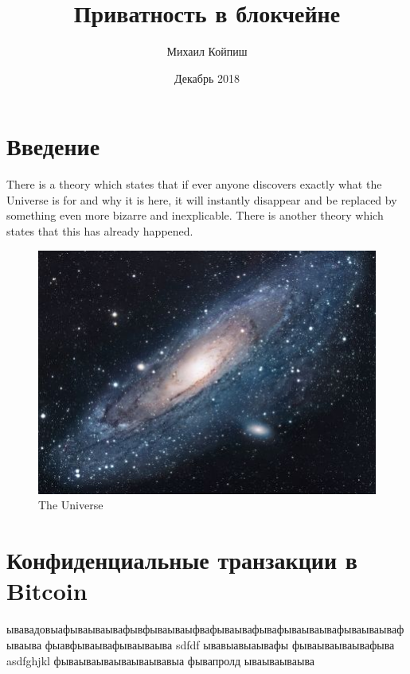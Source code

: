 \documentclass{article}
\title{Приватность в блокчейне}
\author{Михаил Койпиш }
\date{Декабрь 2018}
\begin{document}
\maketitle

\section{Введение}
There is a theory which states that if ever anyone discovers exactly what the Universe is for and why it is here, it will instantly disappear and be replaced by something even more bizarre and inexplicable.
There is another theory which states that this has already happened.

\begin{figure}[h!]
\centering
\includegraphics[scale=1.7]{universe}
\caption{The Universe}
\label{fig:universe}
\end{figure}

\section{Конфиденциальные транзакции в Bitcoin}
ывавадовыафываываывафывфываываыфвафываывафывафываываывафываываывафываыва    фыавфываывафываываыва
sdfdf
ывавыавыаывафы
фываываываывафыва
asdfghjkl
фываываываываываывавыа
фывапролд
ываываываыва


\end{document}
